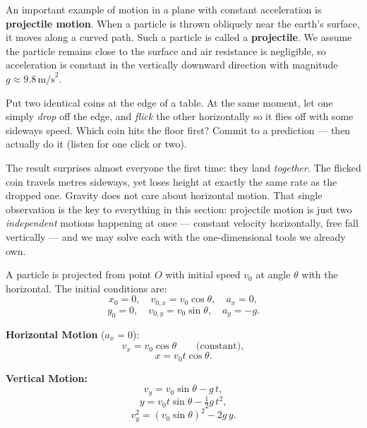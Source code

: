 An important example of motion in a plane with constant acceleration is \textbf{projectile
motion}. When a particle is thrown obliquely near the earth's surface, it moves along a
curved path. Such a particle is called a \textbf{projectile}. We assume the particle remains
close to the surface and air resistance is negligible, so acceleration is constant in the
vertically downward direction with magnitude $g\approx9.8\,\text{m/s}^2$.

\begin{predictbox}
Put two identical coins at the edge of a table. At the same moment, let one
simply \emph{drop} off the edge, and \emph{flick} the other horizontally so it
flies off with some sideways speed. Which coin hits the floor first? Commit
to a prediction --- then actually do it (listen for one click or two).

The result surprises almost everyone the first time: they land
\emph{together}. The flicked coin travels metres sideways, yet loses height
at exactly the same rate as the dropped one. Gravity does not care about
horizontal motion. That single observation is the key to everything in this
section: projectile motion is just two \emph{independent} motions happening at
once --- constant velocity horizontally, free fall vertically --- and we may
solve each with the one-dimensional tools we already own.
\end{predictbox}

A particle is projected from point $O$ with initial speed $v_0$ at angle $\theta$ with the horizontal.
The initial conditions are:
\begin{equation}
  x_0=0, \quad v_{0,x}=v_0\cos\theta, \quad a_x=0,
\end{equation}
\begin{equation}
  y_0=0, \quad v_{0,y}=v_0\sin\theta, \quad a_y=-g.
\end{equation}

\textbf{Horizontal Motion} ($a_x=0$):
\begin{equation}
  v_x = v_0\cos\theta \qquad \text{(constant)},
\end{equation}
\begin{equation}
  x = v_0 t\cos\theta.
\end{equation}

\textbf{Vertical Motion:}
\begin{equation}
  v_y = v_0\sin\theta - g\,t,
\end{equation}
\begin{equation}
  y = v_0 t\sin\theta - \tfrac{1}{2}g\,t^2,
\end{equation}
\begin{equation}
  v_y^2 = (v_0\sin\theta)^2 - 2g\,y.
\end{equation}

